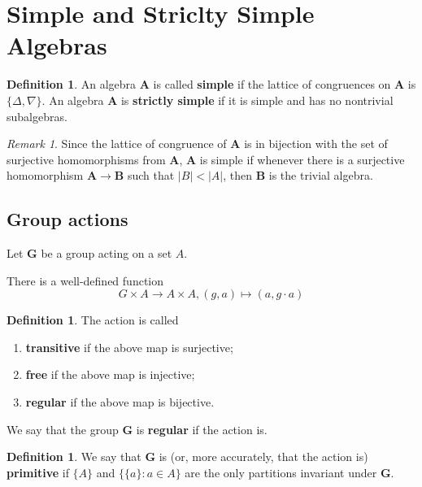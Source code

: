 \documentclass{amsart}
\theoremstyle{plain}
\theoremstyle{definition}
\newtheorem{definition}[theorem]{Definition}
\theoremstyle{remark}
\newtheorem{remark}[theorem]{Remark}
\begin{document}
\section{Simple and Striclty Simple Algebras}
\begin{definition}
    An algebra $\mathbf{A}$ is called \textbf{simple} if the lattice of congruences on $\mathbf{A}$ is $\{\Delta, \nabla \}$. 
    An algebra $\mathbf{A}$ is \textbf{strictly simple} if it is simple and has no nontrivial subalgebras. 
\end{definition}

\begin{remark}
    Since the lattice of congruence of $\mathbf{A}$ is in bijection with the set of surjective homomorphisms from $\mathbf{A}$, 
    $\mathbf{A}$ is simple if whenever there is a surjective homomorphism $\mathbf{A} \to \mathbf{B}$ such that $|B| < |A|$, then $\mathbf{B}$ is the trivial algebra. 
\end{remark}

\subsection{Group actions}
Let $\mathbf{G}$ be a group acting on a set $A$.  

There is a well-defined function
\begin{equation*}
    G \times A \to A \times A, (g,a) \mapsto (a, g \cdot a)
\end{equation*} 

\begin{definition}
    The action is called 
    \begin{enumerate}
        \item \textbf{transitive} if the above map is surjective; 
        \item \textbf{free} if the above map is injective; 
        \item \textbf{regular} if the above map is bijective. 
    \end{enumerate}
    We say that the group $\mathbf{G}$ is \textbf{regular} if the action is. 
\end{definition}

\begin{definition}
    We say that $\mathbf{G}$ is (or, more accurately, that the action is)
        \textbf{primitive} if $\{A\}$ and $\{\{a\} : a \in A\}$ are the only partitions invariant under $\mathbf{G}$. 
\end{definition}
\end{document}
